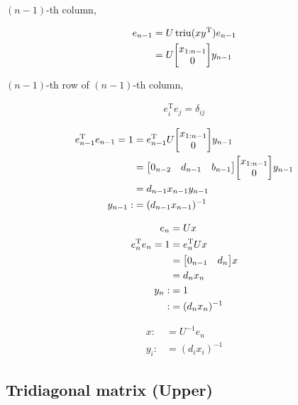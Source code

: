 \documentclass[11pt]{article}
\newcommand{\triu}{\mathop{\mathrm{triu}}}
\newcommand{\T}{\mathrm{T}}
\begin{document}
$(n-1)$-th column, 

\begin{align*}
    e_{n-1} &= U \triu(xy^{\T})e_{n-1} \\
    &= U \mqty[
        x_{1:n-1} \\
        0
        ]y_{n-1}   
\end{align*}

$(n-1)$-th row of $(n-1)$-th column, 

\begin{align*}
    e_{i}^{\T} e_{j} = \delta_{ij} 
\end{align*}

\begin{align*}
    e_{n-1}^{\T} e_{n-1} = 1 &= e_{n-1}^{\T} U \mqty[
        x_{1:n-1} \\
        0
        ]y_{n-1} \\
        &= \mqty[
            0_{n-2} & d_{n-1} & b_{n-1}
        ] \mqty[
            x_{1:n-1} \\
            0
        ]y_{n-1} \\
        & = d_{n-1} x_{n-1} y_{n-1} \\
    y_{n-1} :&= (d_{n-1} x_{n-1})^{-1}
\end{align*}


\begin{align*}
    e_{n} &= U x \\
    e_{n}^{\T} e_{n} = 1 &= e_{n}^{\T} U x \\
        &= \mqty[
            0_{n-1} & d_{n}
        ] x \\
        &= d_{n} x_{n} \\
    y_{n} :&= 1 \\
        :&= (d_{n} x_{n})^{-1}
\end{align*}

\begin{align*}
    x :&= U^{-1} e_n \\
    y_{i} :&= (d_{i} x_{i})^{-1}
\end{align*}





\subsection{Tridiagonal matrix (Upper)}
\end{document}
